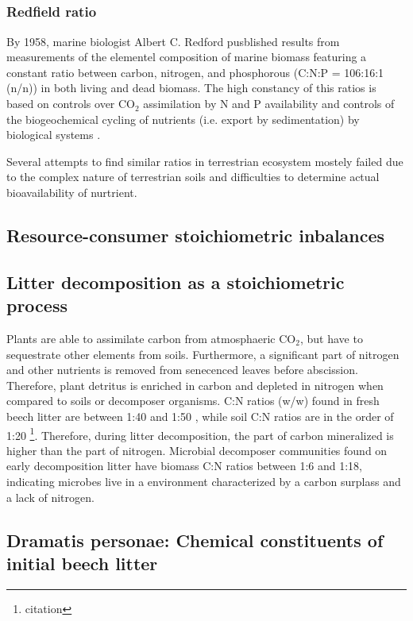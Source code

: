 \subsection{}

\subsubsection{Redfield ratio}
By 1958, marine biologist Albert C. Redford pusblished results from measurements of the elementel composition of marine biomass featuring a constant ratio between carbon, nitrogen, and phosphorous (C:N:P = 106:16:1 (n/n)) in both living and dead biomass. The high constancy of this ratios is based on controls over CO$_2$ assimilation by N and P availability and controls of the  biogeochemical cycling of nutrients (i.e. export by sedimentation) by biological systems \citep{Cleveland2007}. 

Several attempts to find similar ratios in terrestrian ecosystem mostely failed due to the complex nature of terrestrian soils and difficulties to determine actual bioavailability of nurtrient. 

\subsection{Resource-consumer stoichiometric inbalances}

\subsection{Litter decomposition as a stoichiometric process}
Plants are able to assimilate carbon from atmosphaeric CO$_2$, but have to sequestrate other elements from soils. Furthermore, a significant part of nitrogen and other nutrients is removed from senecenced leaves before abscission. Therefore, plant detritus is enriched in carbon and depleted in nitrogen when compared to soils or decomposer organisms. C:N ratios (w/w) found in fresh beech litter are between 1:40 and 1:50 \citep{Mooshammer2011}, while soil C:N ratios are in the order of 1:20 \footnote{citation}. Therefore, during litter decomposition, the part of carbon mineralized is higher than the part of nitrogen. Microbial decomposer communities found on early decomposition litter have biomass C:N ratios between 1:6 and 1:18, indicating microbes live in a environment characterized by a carbon surplass and a lack of nitrogen. 

\subsection{Dramatis personae: Chemical constituents of initial beech litter}

